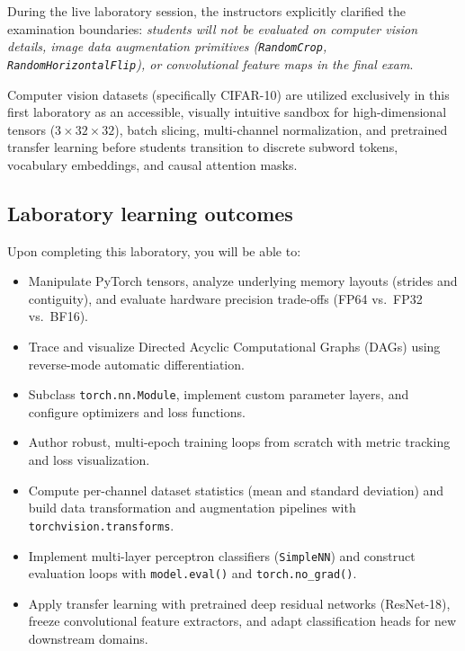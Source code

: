 \documentclass[../labs.tex]{subfiles}
\begin{document}
\begin{examinsight}
During the live laboratory session, the instructors explicitly clarified the examination boundaries: \emph{students will not be evaluated on computer vision details, image data augmentation primitives (\texttt{RandomCrop}, \texttt{RandomHorizontalFlip}), or convolutional feature maps in the final exam}. 

Computer vision datasets (specifically CIFAR-10) are utilized exclusively in this first laboratory as an accessible, visually intuitive sandbox for high-dimensional tensors ($3 \times 32 \times 32$), batch slicing, multi-channel normalization, and pretrained transfer learning before students transition to discrete subword tokens, vocabulary embeddings, and causal attention masks.
\end{examinsight}

\subsection{Laboratory learning outcomes}
Upon completing this laboratory, you will be able to:
\begin{itemize}
    \item Manipulate PyTorch tensors, analyze underlying memory layouts (strides and contiguity), and evaluate hardware precision trade-offs (FP64 vs.\ FP32 vs.\ BF16).
    \item Trace and visualize Directed Acyclic Computational Graphs (DAGs) using reverse-mode automatic differentiation.
    \item Subclass \texttt{torch.nn.Module}, implement custom parameter layers, and configure optimizers and loss functions.
    \item Author robust, multi-epoch training loops from scratch with metric tracking and loss visualization.
    \item Compute per-channel dataset statistics (mean and standard deviation) and build data transformation and augmentation pipelines with \texttt{torchvision.transforms}.
    \item Implement multi-layer perceptron classifiers (\texttt{SimpleNN}) and construct evaluation loops with \texttt{model.eval()} and \texttt{torch.no\_grad()}.
    \item Apply transfer learning with pretrained deep residual networks (ResNet-18), freeze convolutional feature extractors, and adapt classification heads for new downstream domains.
\end{itemize}
\end{document}
